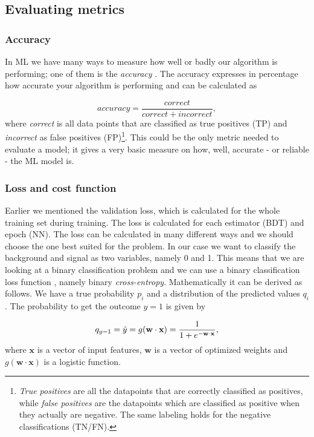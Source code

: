 \subsection{Evaluating metrics}

\subsubsection{Accuracy}
In ML we have many ways to measure how well or badly our algorithm is performing; one of them is the \textit{accuracy} \cite{accuracy}. The accuracy expresses in percentage how accurate your algorithm is performing and can be calculated as

\begin{equation}
    \label{eq:acc}
    accuracy = \frac{correct}{correct + incorrect},
\end{equation}
where \textit{correct} is all data points that are classified as true positives (TP) and \textit{incorrect} as false positives (FP)\footnote{\textit{True positives} are all the datapoints that are correctly classified as positives, while \textit{false positives} are the datapoints which are classified as positive when they actually are negative. The same labeling holds for the negative classifications (TN/FN).}. This could be the only metric needed to evaluate a model; it gives a very basic measure on how, well, accurate - or reliable - the ML model is. 

\subsubsection{Loss and cost function}
Earlier we mentioned the validation loss, which is calculated for the whole training set during training. The loss is calculated for each estimator (BDT) and epoch (NN). The loss can be calculated in many different ways and we should choose the one best suited for the problem. In our case we want to classify the background and signal as two variables, namely 0 and 1. This means that we are looking at a binary classification problem and we can use a binary classification loss function \cite{Loss}, namely binary \textit{cross-entropy}. Mathematically it can be derived as follows. We have a true probability $p_i$ and a distribution of the predicted values $q_i$. The probability to get the outcome $y=1$ is given by

\begin{equation}
    \label{eq:prob1}
    q_{y=1} = \Hat{y} = g(\textbf{w} \cdot \textbf{x}) = \frac{1}{1+e^{-\textbf{w} \cdot \textbf{x}}},
\end{equation}
where $\textbf{x}$ is a vector of input features, $\textbf{w}$ is a vector of optimized weights and $g(\textbf{w} \cdot \textbf{x})$ is a logistic function.

